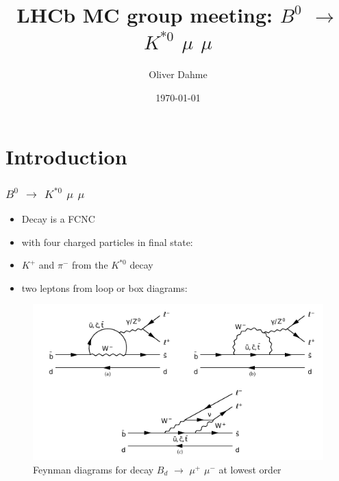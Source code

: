 \documentclass{beamer}
\title[$B^0$ $\rightarrow$ $K^{*0}$ $\mu$ $\mu$]{LHCb MC group meeting: $B^0$ $\rightarrow$ $K^{*0}$ $\mu$ $\mu$} %
\author{Oliver Dahme} %
\institute[UZH] %
{
University of Zurich \\ %
\medskip
\textit{o.dahme@cern.ch} %
}
\date{\today} %
\begin{document}
\begin{frame}
\titlepage %
\end{frame}




\section{Introduction} %

\begin{frame}
\frametitle{$B^0$ $\rightarrow$ $K^{*0}$ $\mu$ $\mu$}

\begin{itemize}
  \item Decay is a FCNC
  \item with four charged particles in final state:
  \item $K^+$ and $\pi^-$ from the $K^{*0}$ decay
  \item two leptons from loop or box diagrams:
\end{itemize}


\begin{figure}
\includegraphics[width=0.8\linewidth]{KstarFeynman}
\caption{Feynman diagrams for decay $B_d$ $\rightarrow$ $\mu^+$ $\mu^-$ at lowest order}
\end{figure}
\end{frame}
\end{document}
